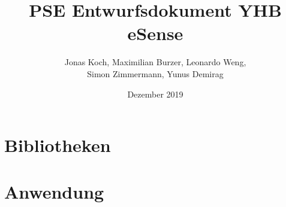 \documentclass[12pt,a4paper,titlepage,ngerman]{article}
\title{PSE Entwurfsdokument YHB eSense}
\author{Jonas Koch, Maximilian Burzer, Leonardo Weng, \\ Simon Zimmermann, Yunus Demirag}
\date{Dezember 2019}
\begin{document}
	
	\section{Bibliotheken}
	
	
	\section{Anwendung}
	
	
	
\end{document}
